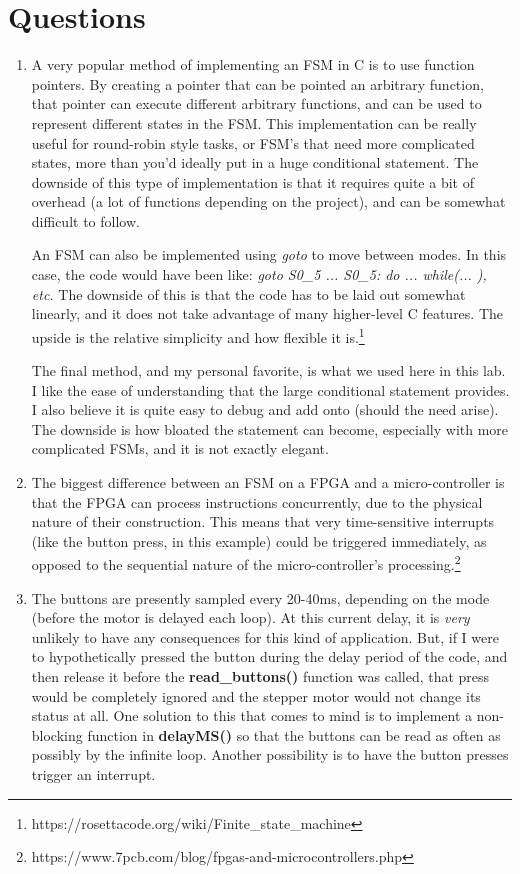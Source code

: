 \documentclass[a4paper, 12pt]{article}
\begin{document}
\section{Questions}
\begin{enumerate}
\item A very popular method of implementing an FSM in C is to use function pointers. By creating a pointer that can be pointed an arbitrary function, that pointer can execute different arbitrary functions, and can be used to represent different states in the FSM. This implementation can be really useful for round-robin style tasks, or FSM's that need more complicated states, more than you'd ideally put in a huge conditional statement. The downside of this type of implementation is that it requires quite a bit of overhead (a lot of functions depending on the project), and can be somewhat difficult to follow.

An FSM can also be implemented using \textit{goto} to move between modes. In this case, the code would have been like: \textit{goto S0\_5 ... S0\_5: do { ... } while(... ), etc.} The downside of this is that the code has to be laid out somewhat linearly, and it does not take advantage of many higher-level C features. The upside is the relative simplicity and how flexible it is.\footnote{https://rosettacode.org/wiki/Finite\_state\_machine}

The final method, and my personal favorite, is what we used here in this lab. I like the ease of understanding that the large conditional statement provides. I also believe it is quite easy to debug and add onto (should the need arise). The downside is how bloated the statement can become, especially with more complicated FSMs, and it is not exactly elegant.

\item The biggest difference between an FSM on a FPGA and a micro-controller is that the FPGA can process instructions concurrently, due to the physical nature of their construction. This means that very time-sensitive interrupts (like the button press, in this example) could be triggered immediately, as opposed to the sequential nature of the micro-controller's processing.\footnote{https://www.7pcb.com/blog/fpgas-and-microcontrollers.php}

\item The buttons are presently sampled every 20-40ms, depending on the mode (before the motor is delayed each loop). At this current delay, it is \textit{very} unlikely to have any consequences for this kind of application. But, if I were to hypothetically pressed the button during the delay period of the code, and then release it before the \textbf{read\_buttons()} function was called, that press would be completely ignored and the stepper motor would not change its status at all. One solution to this that comes to mind is to implement a non-blocking function in \textbf{delayMS()} so that the buttons can be read as often as possibly by the infinite loop. Another possibility is to have the button presses trigger an interrupt.
\end{enumerate}
\end{document}
